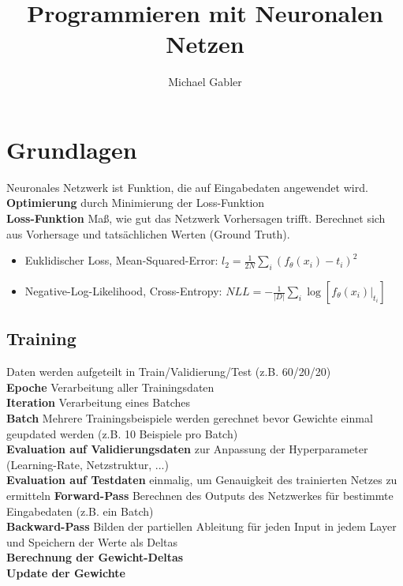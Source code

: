 \documentclass[12pt]{article}
\begin{document}
	\title{Programmieren mit Neuronalen Netzen}
	\author{Michael Gabler}
	\maketitle
	\tableofcontents
	\newpage

	\section{Grundlagen}
	Neuronales Netzwerk ist Funktion, die auf Eingabedaten angewendet wird.\\
	\textbf{Optimierung} durch Minimierung der Loss-Funktion\\
	\textbf{Loss-Funktion} Maß, wie gut das Netzwerk Vorhersagen trifft. Berechnet sich aus Vorhersage und tatsächlichen Werten (Ground Truth).
	\begin{itemize}
		\item Euklidischer Loss, Mean-Squared-Error: $l_2 = \frac{1}{2N} \sum_i (f_\theta(x_i)-t_i)^2$
		\item Negative-Log-Likelihood, Cross-Entropy: $NLL = -\frac{1}{|D|}\sum_i \log[f_\theta(x_i)|_{t_i}]$
		
	\end{itemize}
	
	\subsection{Training}
	Daten werden aufgeteilt in Train/Validierung/Test (z.B. 60/20/20)\\
	\textbf{Epoche} Verarbeitung aller Trainingsdaten\\
	\textbf{Iteration} Verarbeitung eines Batches\\
	\textbf{Batch} Mehrere Trainingsbeispiele werden gerechnet bevor Gewichte einmal geupdated werden (z.B. 10 Beispiele pro Batch)\\
	\textbf{Evaluation auf Validierungsdaten} zur Anpassung der Hyperparameter (Learning-Rate, Netzstruktur, ...)\\
	\textbf{Evaluation auf Testdaten} einmalig, um Genauigkeit des trainierten Netzes zu ermitteln
	\textbf{Forward-Pass} Berechnen des Outputs des Netzwerkes für bestimmte Eingabedaten (z.B. ein Batch)\\
	\textbf{Backward-Pass} Bilden der partiellen Ableitung für jeden Input in jedem Layer und Speichern der Werte als Deltas\\
	\textbf{Berechnung der Gewicht-Deltas}\\
	\textbf{Update der Gewichte}
\end{document}
